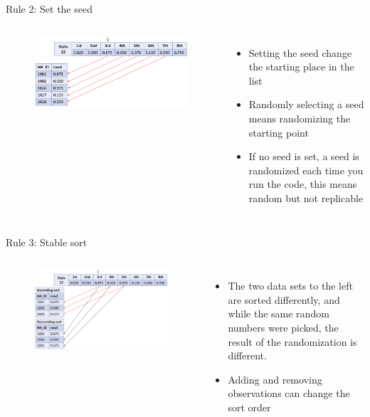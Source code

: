 \documentclass[aspectratio=169]{beamer}
\begin{document}
\begin{frame}{Rule 2: Set the seed}
	\begin{columns}[c]
		\begin{figure}
			\centering
			\includegraphics[width=\linewidth]{img/rule2}
		\end{figure}
		\begin{itemize}
			\item \small Setting the seed change the starting place in the list
			\item \small Randomly selecting a seed means randomizing the starting point
			\item \small If no seed is set, a seed is randomized each time you run the code, this means random but not replicable
		\end{itemize}
	\end{columns}
\end{frame}


\begin{frame}{Rule 3: Stable sort}
	\begin{columns}[c]
		\begin{figure}
			\centering
			\includegraphics[width=\linewidth]{img/rule3}
		\end{figure}
		\begin{itemize}
			\item \small The two data sets to the left are sorted differently, and while the same random numbers were picked, the result of the randomization is different.
			\item \small Adding and removing observations can change the sort order
		\end{itemize}
	\end{columns}
\end{frame}
\end{document}

